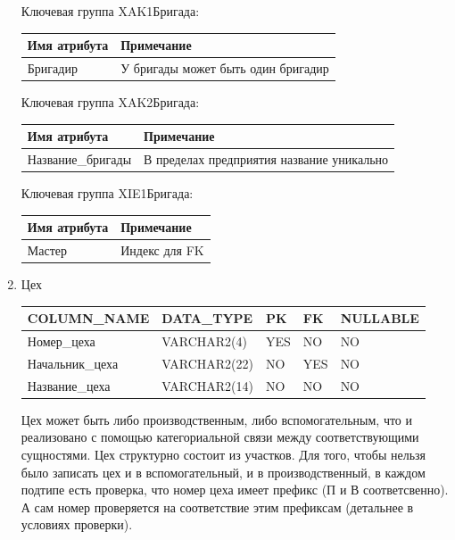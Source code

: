 \begin{enumerate}
\begin{tabular}{|p{7cm}|p{3cm}|p{1cm}|p{1cm}|p{3cm}|}
    \end{tabular}

    Ключевая группа XAK1Бригада:

    \begin{tabular}{|p{7cm}|p{9.3cm}|} \hline

        {\bf Имя атрибута} & {\bf Примечание} \\ \hline
        Бригадир & У бригады может быть один бригадир\\ \hline

    \end{tabular}

    Ключевая группа XAK2Бригада:

    \begin{tabular}{|p{7cm}|p{9.3cm}|} \hline

        {\bf Имя атрибута} & {\bf Примечание} \\ \hline
        Название\_бригады & В пределах предприятия название уникально \\ \hline

    \end{tabular}

    Ключевая группа XIE1Бригада:

    \begin{tabular}{|p{7cm}|p{9.3cm}|} \hline

        {\bf Имя атрибута} & {\bf Примечание} \\ \hline
        Мастер & Индекс для FK \\ \hline

    \end{tabular}

    \item{Цех}

    \begin{tabular}{|p{7cm}|p{3cm}|p{1cm}|p{1cm}|p{3cm}|} \hline

        {\bf COLUMN\_NAME} & {\bf DATA\_TYPE} & {\bf PK} & {\bf FK} & {\bf NULLABLE} \\ \hline
        Номер\_цеха & VARCHAR2(4) & YES & NO & NO \\ \hline
        Начальник\_цеха & VARCHAR2(22) & NO & YES & NO \\ \hline
        Название\_цеха & VARCHAR2(14) & NO & NO & NO \\ \hline

    \end{tabular}

    Цех может быть либо производственным, либо вспомогательным, что и реализовано с помощью категориальной связи между соответствующими сущностями.
    Цех структурно состоит из участков.
    Для того, чтобы нельзя было записать цех и в вспомогательный, и в производственный, в каждом подтипе есть проверка, что номер цеха имеет префикс (П и В соответсвенно).
    А сам номер проверяется на соответствие этим префиксам (детальнее в условиях проверки).


\end{enumerate}
